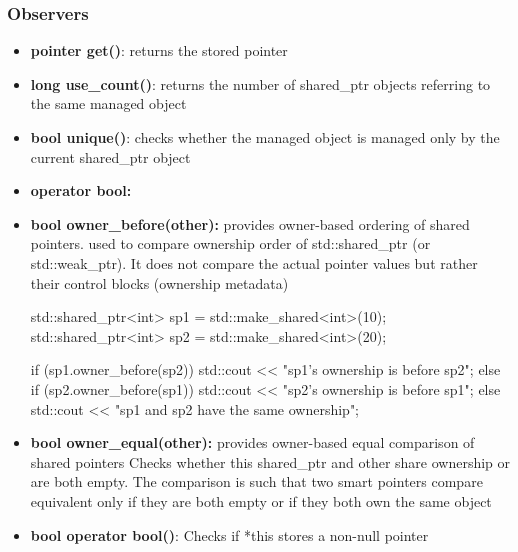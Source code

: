 \documentclass{report}
\begin{document}
        \bigbreak \noindent 
        \subsubsection{Observers}
        \begin{itemize}
            \item \textbf{pointer get()}: returns the stored pointer
            \item \textbf{long use\_count()}: returns the number of shared\_ptr objects referring to the same managed object
            \item \textbf{bool unique()}: checks whether the managed object is managed only by the current shared\_ptr object
            \item \textbf{operator bool:}
            \item \textbf{bool owner\_before(other):} provides owner-based ordering of shared pointers. used to compare ownership order of std::shared\_ptr (or std::weak\_ptr). It does not compare the actual pointer values but rather their control blocks (ownership metadata)
                \bigbreak \noindent 
                \begin{cppcode}
                    std::shared_ptr<int> sp1 = std::make_shared<int>(10);
                    std::shared_ptr<int> sp2 = std::make_shared<int>(20);

                    if (sp1.owner_before(sp2)) {
                        std::cout << "sp1's ownership is before sp2\n";
                    } else if (sp2.owner_before(sp1)) {
                        std::cout << "sp2's ownership is before sp1\n";
                    } else {
                        std::cout << "sp1 and sp2 have the same ownership\n";
                    }
                \end{cppcode}
            \item \textbf{bool owner\_equal(other):} provides owner-based equal comparison of shared pointers
                \bigbreak \noindent 
                Checks whether this shared\_ptr and other share ownership or are both empty. The comparison is such that two smart pointers compare equivalent only if they are both empty or if they both own the same object
            \item \textbf{bool operator bool()}: Checks if *this stores a non-null pointer
        \end{itemize}

        \bigbreak \noindent 
\end{document}
